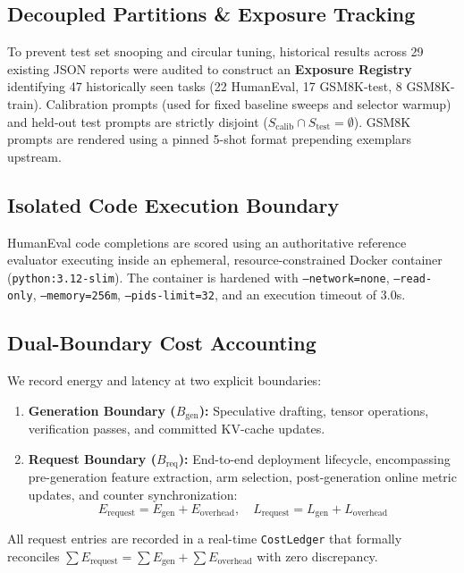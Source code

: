 \documentclass[10pt,twocolumn,letterpaper]{article}
\begin{document}
\subsection{Decoupled Partitions \& Exposure Tracking}
To prevent test set snooping and circular tuning, historical results across 29 existing JSON reports were audited to construct an \textbf{Exposure Registry} identifying 47 historically seen tasks (22 HumanEval, 17 GSM8K-test, 8 GSM8K-train). Calibration prompts (used for fixed baseline sweeps and selector warmup) and held-out test prompts are strictly disjoint ($S_{\text{calib}} \cap S_{\text{test}} = \emptyset$). GSM8K prompts are rendered using a pinned 5-shot format prepending exemplars upstream.

\subsection{Isolated Code Execution Boundary}
HumanEval code completions are scored using an authoritative reference evaluator executing inside an ephemeral, resource-constrained Docker container (\texttt{python:3.12-slim}). The container is hardened with \texttt{--network=none}, \texttt{--read-only}, \texttt{--memory=256m}, \texttt{--pids-limit=32}, and an execution timeout of 3.0s.

\subsection{Dual-Boundary Cost Accounting}
We record energy and latency at two explicit boundaries:
\begin{enumerate}
    \item \textbf{Generation Boundary ($B_{\text{gen}}$):} Speculative drafting, tensor operations, verification passes, and committed KV-cache updates.
    \item \textbf{Request Boundary ($B_{\text{req}}$):} End-to-end deployment lifecycle, encompassing pre-generation feature extraction, arm selection, post-generation online metric updates, and counter synchronization:
    \begin{equation}
    E_{\text{request}} = E_{\text{gen}} + E_{\text{overhead}}, \quad L_{\text{request}} = L_{\text{gen}} + L_{\text{overhead}}
    \end{equation}
\end{enumerate}
All request entries are recorded in a real-time \texttt{CostLedger} that formally reconciles $\sum E_{\text{request}} = \sum E_{\text{gen}} + \sum E_{\text{overhead}}$ with zero discrepancy.
\end{document}
